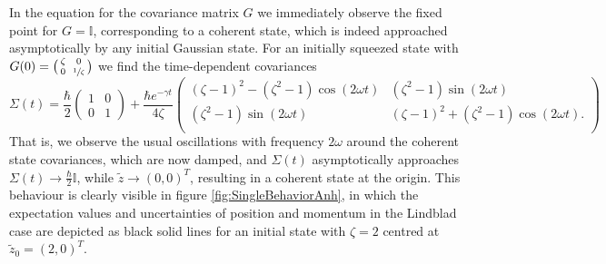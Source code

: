 \documentclass[12pt]{iopart} %
\begin{document}
In the equation for the covariance matrix $G$ we immediately observe the fixed point for $G=\mathbb{I}$, corresponding to a coherent state, which is indeed approached asymptotically by any initial Gaussian state. For an initially squeezed state with $G(0)=\big(\begin{smallmatrix}\zeta&&0\\0&&\sfrac{1}{\zeta}\end{smallmatrix} \big)$ we find the time-dependent covariances
\begin{equation}
    \Sigma(t)=\frac{\hbar}{2}
\begin{pmatrix}1&0\\0&1\end{pmatrix}+ \frac{\hbar e^{-\gamma t}}{4 \zeta}\begin{pmatrix}
 (\zeta -1)^2-\left(\zeta ^2-1\right) \cos (2 \omega t  ) &
   \left(\zeta ^2-1\right)  \sin (2 \omega t ) \\
  \left(\zeta ^2-1\right) \sin (2\omega t  ) &  (\zeta
   -1)^2+\left(\zeta ^2-1\right) \cos (2 \omega t  ). \\
\end{pmatrix}
\end{equation}
That is, we observe the usual oscillations with frequency $2\omega$ around the coherent state covariances, which are now damped, and $\Sigma(t)$ asymptotically approaches $\Sigma(t)\to\frac{\hbar}{2}\mathbb{I}$, while $\tilde z\to (0,0)^T$, resulting in a coherent state at the origin. This behaviour is clearly visible in figure \ref{fig:SingleBehaviorAnh}, in which the expectation values and uncertainties of position and momentum in the Lindblad case are depicted as black solid lines for an initial state with $\zeta=2$ centred at $\tilde z_0=(2,0)^T$. 
\end{document}
